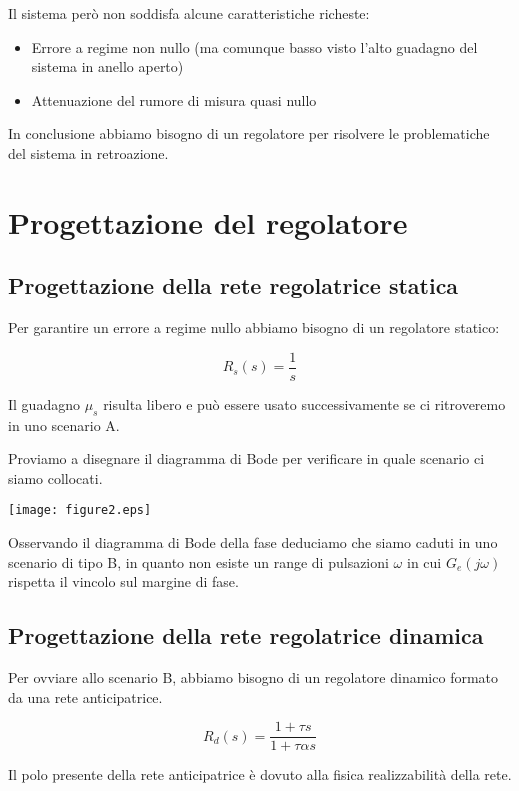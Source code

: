 \documentclass{article}
\begin{document}
Il sistema però non soddisfa alcune caratteristiche richeste:

\begin{itemize}
    \item Errore a regime non nullo (ma comunque basso visto l'alto guadagno del sistema in anello aperto)
    \item Attenuazione del rumore di misura quasi nullo
\end{itemize}

In conclusione abbiamo bisogno di un regolatore per risolvere le problematiche del sistema in retroazione.

\section{Progettazione del regolatore}

\subsection{Progettazione della rete regolatrice statica}

Per garantire un errore a regime nullo abbiamo bisogno di un regolatore statico:

$$
R_s(s)=\frac{1}{s}
$$

Il guadagno $\mu_s$ risulta libero e può essere usato successivamente se ci ritroveremo in uno scenario A.

Proviamo a disegnare il diagramma di Bode per verificare in quale scenario ci siamo collocati.

\begin{center}
    \texttt{[image: figure2.eps]}
\end{center}

Osservando il diagramma di Bode della fase deduciamo che siamo caduti in uno scenario di tipo B, in quanto non esiste un range di pulsazioni $\omega$ in cui $G_e(j\omega)$ rispetta il vincolo sul margine di fase.

\subsection{Progettazione della rete regolatrice dinamica}

Per ovviare allo scenario B, abbiamo bisogno di un regolatore dinamico formato da una rete anticipatrice.

$$
R_d(s)=\frac{1+\tau s}{1+\tau \alpha s}
$$

Il polo presente della rete anticipatrice è dovuto alla fisica realizzabilità della rete.
\end{document}
